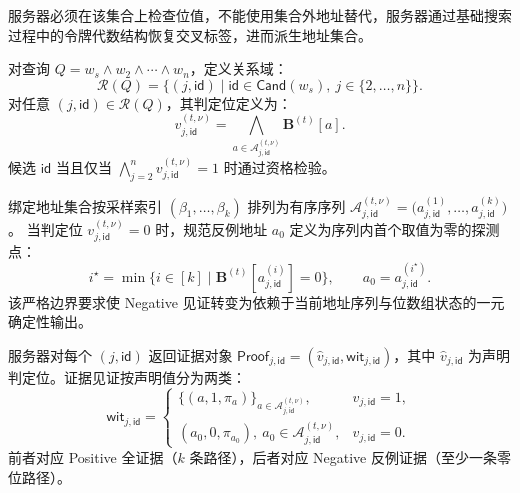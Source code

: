 服务器必须在该集合上检查位值，不能使用集合外地址替代，服务器通过基础搜索过程中的令牌代数结构恢复交叉标签，进而派生地址集合。

对查询 $Q=w_s\wedge w_2\wedge\cdots\wedge w_n$，定义关系域：
\begin{equation*}
\mathcal{R}(Q)=\{(j,\mathsf{id})\mid \mathsf{id}\in\mathsf{Cand}(w_s),\ j\in\{2,\ldots,n\}\}\text{.}
\end{equation*}
对任意 $(j,\mathsf{id})\in\mathcal{R}(Q)$，其判定位定义为：
\begin{equation}
v_{j,\mathsf{id}}^{(t,\nu)}=\bigwedge_{a\in\mathcal{A}_{j,\mathsf{id}}^{(t,\nu)}} \mathbf{B}^{(t)}[a]\text{.}\label{eq:vq-judgment-bit}
\end{equation}
候选 $\mathsf{id}$ 当且仅当 $\bigwedge_{j=2}^{n}v_{j,\mathsf{id}}^{(t,\nu)}=1$ 时通过资格检验。

绑定地址集合按采样索引 $(\beta_1,\ldots,\beta_k)$ 排列为有序序列 $\mathcal{A}_{j,\mathsf{id}}^{(t,\nu)}=\big(a_{j,\mathsf{id}}^{(1)},\ldots,a_{j,\mathsf{id}}^{(k)}\big)$。
当判定位 $v_{j,\mathsf{id}}^{(t,\nu)}=0$ 时，规范反例地址 $a_0$ 定义为序列内首个取值为零的探测点：
\begin{equation*}
i^\star=\min\{i\in[k]\mid \mathbf{B}^{(t)}[a_{j,\mathsf{id}}^{(i)}]=0\},\qquad a_0=a_{j,\mathsf{id}}^{(i^\star)}\text{.}
\end{equation*}
该严格边界要求使 Negative 见证转变为依赖于当前地址序列与位数组状态的一元确定性输出。 

服务器对每个 $(j,\mathsf{id})$ 返回证据对象 $\mathsf{Proof}_{j,\mathsf{id}}=(\widehat{v}_{j,\mathsf{id}},\mathsf{wit}_{j,\mathsf{id}})$，其中 $\widehat{v}_{j,\mathsf{id}}$ 为声明判定位。证据见证按声明值分为两类：
\begin{equation}\label{eq:vq-witness}
\mathsf{wit}_{j,\mathsf{id}}=
\begin{cases}
\{(a,1,\pi_a)\}_{a\in \mathcal{A}_{j,\mathsf{id}}^{(t,\nu)}}, & \widehat{v}_{j,\mathsf{id}}=1,\\
(a_0,0,\pi_{a_0}),\ a_0\in \mathcal{A}_{j,\mathsf{id}}^{(t,\nu)}, & \widehat{v}_{j,\mathsf{id}}=0.
\end{cases}
\end{equation}
前者对应 Positive 全证据（$k$ 条路径），后者对应 Negative 反例证据（至少一条零位路径）。 

